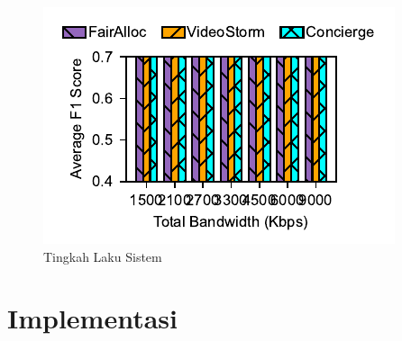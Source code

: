     \begin{figure}[tbh]
        \centering
        \includegraphics{./resources/concierge-perf.pdf}
        \caption{Tingkah Laku Sistem}\label{fig:resource_alloc_tes}
    \end{figure}

\section{Implementasi}
